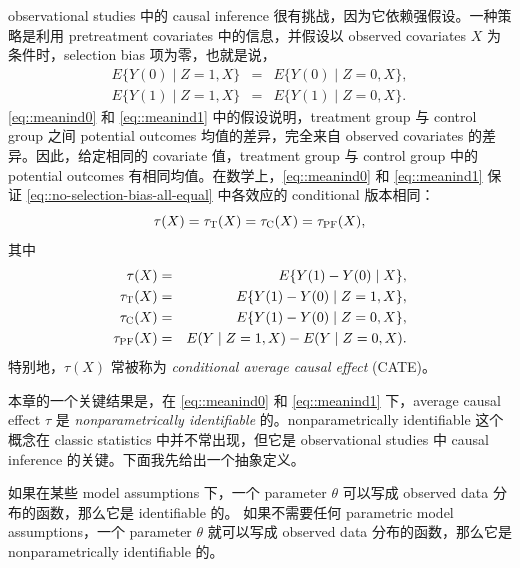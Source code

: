  
 observational studies 中的 causal inference 很有挑战，因为它依赖强假设。一种策略是利用 pretreatment covariates 中的信息，并假设以 observed covariates $X$ 为条件时，selection bias 项为零，也就是说，
\begin{eqnarray}
\label{eq::meanind0} E\{   Y(0)  \mid Z = 1, X \} &=& E\{   Y(0)  \mid Z = 0, X \}  ,\\
\label{eq::meanind1} E\{   Y(1)  \mid Z = 1 , X\} &=& E\{   Y(1)  \mid Z = 0, X \}   . 
\end{eqnarray}
\eqref{eq::meanind0} 和 \eqref{eq::meanind1} 中的假设说明，treatment group 与 control group 之间 potential outcomes 均值的差异，完全来自 observed covariates 的差异。因此，给定相同的 covariate 值，treatment group 与 control group 中的 potential outcomes 有相同均值。在数学上，\eqref{eq::meanind0} 和 \eqref{eq::meanind1} 保证 \eqref{eq::no-selection-bias-all-equal} 中各效应的 conditional 版本相同： 
 $$
 \tau(X) = \tau_\textsc{T}(X) =  \tau_\textsc{C}(X) = \tau_\textsc{PF}(X),
 $$
其中
\begin{eqnarray*}
 \tau(X)  &=& E\{ Y(1) - Y(0) \mid X  \}, \\
 \tau_\textsc{T}(X) &=&  E\{ Y(1) - Y(0) \mid Z=1,  X  \},\\
  \tau_\textsc{C}(X) &=& E\{ Y(1) - Y(0) \mid Z=0,  X  \},\\
   \tau_\textsc{PF}(X) &=& E(Y\mid Z=1, X) - E(Y\mid Z=0, X).
\end{eqnarray*}
特别地，$ \tau(X) $ 常被称为 {\it conditional average causal effect} (CATE)。 



本章的一个关键结果是，在 \eqref{eq::meanind0} 和 \eqref{eq::meanind1} 下，average causal effect $\tau$ 是 {\it nonparametrically identifiable} 的。nonparametrically identifiable 这个概念在 classic statistics 中并不常出现，但它是 observational studies 中 causal inference 的关键。下面我先给出一个抽象定义。 

\begin{definition}[identification]
\label{def::nonparametric-identification}
如果在某些 model assumptions 下，一个 parameter $\theta$ 可以写成 observed data 分布的函数，那么它是 identifiable 的。 
如果不需要任何 parametric model assumptions，一个 parameter $\theta$ 就可以写成 observed data 分布的函数，那么它是 nonparametrically identifiable 的。 
\end{definition}



